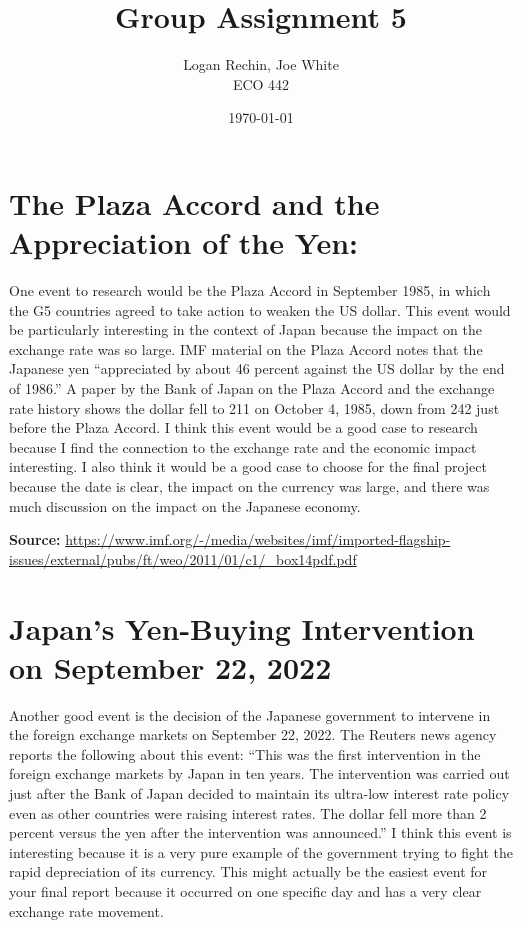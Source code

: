 \documentclass[11pt]{article}
\begin{document}
\title{Group Assignment 5}
\author{Logan Rechin, Joe White\\ECO 442}
\date{\today}
\maketitle

\section*{The Plaza Accord and the Appreciation of the Yen:}

One event to research would be the Plaza Accord in September 1985, in which the G5 countries agreed to take action to weaken the US dollar. This event would be particularly interesting in the context of Japan because the impact on the exchange rate was so large. IMF material on the Plaza Accord notes that the Japanese yen ``appreciated by about 46 percent against the US dollar by the end of 1986.'' A paper by the Bank of Japan on the Plaza Accord and the exchange rate history shows the dollar fell to 211 on October 4, 1985, down from 242 just before the Plaza Accord. I think this event would be a good case to research because I find the connection to the exchange rate and the economic impact interesting. I also think it would be a good case to choose for the final project because the date is clear, the impact on the currency was large, and there was much discussion on the impact on the Japanese economy.

\textbf{Source:} \url{https://www.imf.org/-/media/websites/imf/imported-flagship-issues/external/pubs/ft/weo/2011/01/c1/_box14pdf.pdf}

\section*{Japan's Yen-Buying Intervention on September 22, 2022}

Another good event is the decision of the Japanese government to intervene in the foreign exchange markets on September 22, 2022. The Reuters news agency reports the following about this event: ``This was the first intervention in the foreign exchange markets by Japan in ten years. The intervention was carried out just after the Bank of Japan decided to maintain its ultra-low interest rate policy even as other countries were raising interest rates. The dollar fell more than 2 percent versus the yen after the intervention was announced.'' I think this event is interesting because it is a very pure example of the government trying to fight the rapid depreciation of its currency. This might actually be the easiest event for your final report because it occurred on one specific day and has a very clear exchange rate movement.
\end{document}
